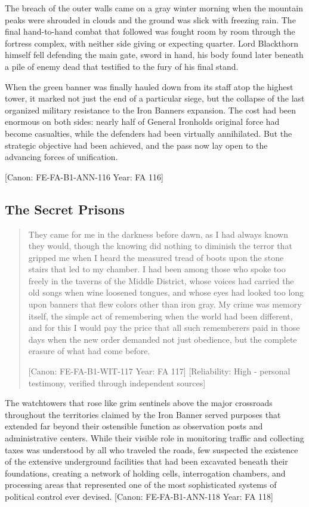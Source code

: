 The breach of the outer walls came on a gray winter morning when the
mountain peaks were shrouded in clouds and the ground was slick with
freezing rain. The final hand-to-hand combat that followed was fought
room by room through the fortress complex, with neither side giving or
expecting quarter. Lord Blackthorn himself fell defending the main gate,
sword in hand, his body found later beneath a pile of enemy dead that
testified to the fury of his final stand.

When the green banner was finally hauled down from its staff atop the
highest tower, it marked not just the end of a particular siege, but the
collapse of the last organized military resistance to the Iron
Banner\textquotesingle s expansion. The cost had been enormous on both
sides: nearly half of General Ironhold\textquotesingle s original force
had become casualties, while the defenders had been virtually
annihilated. But the strategic objective had been achieved, and the pass
now lay open to the advancing forces of unification.

{[}Canon: FE-FA-B1-ANN-116 \textbar{} Year: FA 116{]}

\subsection{The Secret Prisons}\label{the-secret-prisons}

\begin{quote}
They came for me in the darkness before dawn, as I had always known they
would, though the knowing did nothing to diminish the terror that
gripped me when I heard the measured tread of boots upon the stone
stairs that led to my chamber. I had been among those who spoke too
freely in the taverns of the Middle District, whose voices had carried
the old songs when wine loosened tongues, and whose eyes had looked too
long upon banners that flew colors other than iron gray. My crime was
memory itself, the simple act of remembering when the world had been
different, and for this I would pay the price that all such rememberers
paid in those days when the new order demanded not just obedience, but
the complete erasure of what had come before.

{[}Canon: FE-FA-B1-WIT-117 \textbar{} Year: FA 117{]} {[}Reliability:
High - personal testimony, verified through independent sources{]}
\end{quote}

The watchtowers that rose like grim sentinels above the major crossroads
throughout the territories claimed by the Iron Banner served purposes
that extended far beyond their ostensible function as observation posts
and administrative centers. While their visible role in monitoring
traffic and collecting taxes was understood by all who traveled the
roads, few suspected the existence of the extensive underground
facilities that had been excavated beneath their foundations, creating a
network of holding cells, interrogation chambers, and processing areas
that represented one of the most sophisticated systems of political
control ever devised. {[}Canon: FE-FA-B1-ANN-118 \textbar{} Year: FA
118{]}


